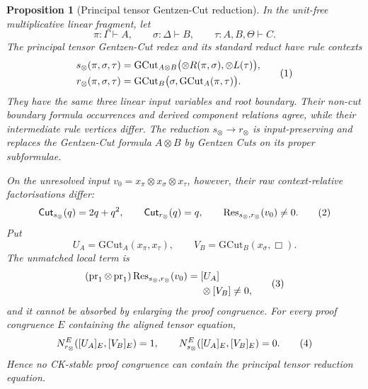 \documentclass[10pt,a4paper]{article}
\theoremstyle{plain}
\newtheorem{proposition}[theorem]{Proposition}
\theoremstyle{definition}
\theoremstyle{remark}
\newcommand{\ms}{\mathrel{\vdash}}
\newcommand{\eqtag}{\refstepcounter{equation}\tag{\theequation}}
\begin{document}
\begin{proposition}[Principal tensor Gentzen-Cut reduction]
\label{prop:positive-tensor-harmony}
In the unit-free multiplicative linear fragment, let
\[
 \pi:\Gamma\ms A,\qquad
 \sigma:\Delta\ms B,\qquad
 \tau:A,B,\Theta\ms C .
\]
The principal tensor Gentzen-Cut redex and its standard reduct have rule
contexts
\[
\begin{aligned}
 s_\otimes(\pi,\sigma,\tau)
   &=\mathrm{GCut}_{A\otimes B}
       \bigl(\otimes R(\pi,\sigma),\otimes L(\tau)\bigr),\\
 r_\otimes(\pi,\sigma,\tau)
   &=\mathrm{GCut}_{B}
       \bigl(\sigma,\mathrm{GCut}_{A}(\pi,\tau)\bigr).
\end{aligned}
\eqtag\label{eq:linear-tensor-cut-reduction}
\]
They have the same three linear input variables and root boundary.  Their
non-cut boundary formula occurrences and derived component relations agree, while
their intermediate rule vertices differ.  The reduction
\(s_\otimes\to r_\otimes\) is input-preserving and replaces the
Gentzen-Cut formula
\(A\otimes B\) by Gentzen Cuts on its proper subformulae.

On the unresolved input
\(v_0=x_\pi\otimes x_\sigma\otimes x_\tau\), however, their raw
context-relative factorisations differ:
\[
 \mathsf{Cut}_{s_\otimes}(q)=2q+q^2,\qquad
 \mathsf{Cut}_{r_\otimes}(q)=q,
 \qquad
 \operatorname{Res}_{s_\otimes,r_\otimes}(v_0)\ne0 .
\eqtag\label{eq:linear-tensor-cut-residue}
\]
Put
\[
 U_A=\mathrm{GCut}_{A}(x_\pi,x_\tau),
 \qquad
 V_B=\mathrm{GCut}_{B}(x_\sigma,\Box).
\]
The unmatched local term is
\[
\begin{aligned}
(\operatorname{pr}_1\otimes\operatorname{pr}_1)
 \operatorname{Res}_{s_\otimes,r_\otimes}(v_0)
  ={}&
 [U_A]\\
 &\otimes
 [V_B]
 \ne0 ,
\end{aligned}
\eqtag\label{eq:tensor-bidegree-obstruction}
\]
and it cannot be absorbed by enlarging the proof congruence.  For every proof
congruence \(E\) containing the aligned tensor equation,
\[
 N_{r_\otimes}^{E}([U_A]_E,[V_B]_E)=1,
 \qquad
 N_{s_\otimes}^{E}([U_A]_E,[V_B]_E)=0.
\eqtag\label{eq:tensor-absolute-factor-obstruction}
\]
Hence no CK-stable proof congruence can contain the principal tensor
reduction equation.
\end{proposition}
\end{document}
